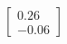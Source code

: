 \documentclass[preview]{standalone}
\begin{document}
\begin{align*}
\begin{bmatrix} 0.26 \\ -0.06 \end{bmatrix}
\end{align*}
\end{document}
